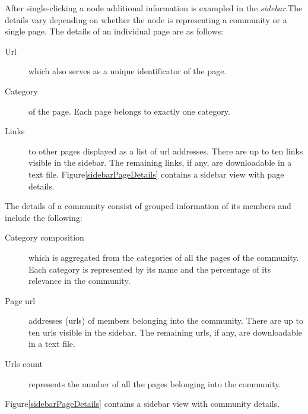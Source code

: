 After single-clicking a node additional information is exampled in the \textit{sidebar}.The details vary depending on whether the node is representing a community or a single page. 
The details of an individual page are as follows: 
\begin {description}
	\item [Url] which also serves as a unique identificator of the page. 
	\item [Category] of the page. Each page belongs to exactly one category.
	\item[Links] to other pages displayed as a list of url addresses. There are up to ten links visible in the sidebar. The remaining links, if any, are downloadable in a text file. 
Figure\ref{sidebarPageDetails} contains a sidebar view with page details.
\end{description}

The details of a community consist of grouped information of its members and include the following:
\begin {description}
	\item [Category composition] which is aggregated from the categories of all the pages of the community. Each category is represented by its name and the percentage of its relevance in the community.
	\item [Page url] addresses (urls) of members belonging into the community. There are up to ten urls visible in the sidebar. The remaining urls, if any, are downloadable in a text file. 
	\item[Urls count]represents the number of all the pages belonging into the community. 
\end{description}
Figure\ref{sidebarPageDetails} contains a sidebar view with community details.

